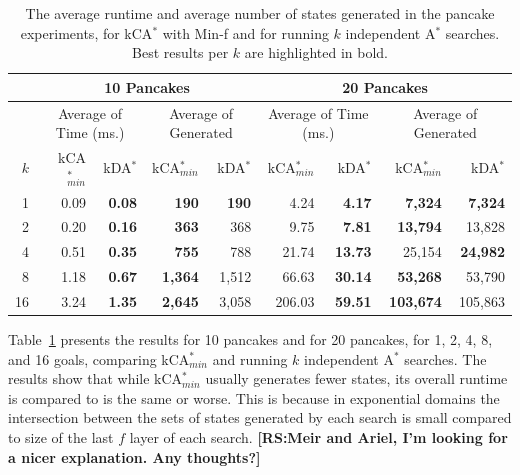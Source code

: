 \documentclass{aicom2e}
\newcommand{\astar}{A$^*$}
\newcommand{\kastar}{kCA$^*$}
\newcommand{\kastarmin}{kCA$^*_{min}$}
\newcommand{\kxastar}{kDA$^*$}
\newcommand{\minf}{Min-f}
\newcommand{\roni}[1]{\textbf{[RS:#1]}}
\begin{document}
\begin{table}[]
    \centering
    \begin{tabular}{|r|r|r|r|r|r|r|r|r|}
    \hline
        & \multicolumn{4}{c|}{{\bf 10 Pancakes}} & \multicolumn{4}{c|}{{\bf 20 Pancakes}}    \\
        \hline
        & \multicolumn{2}{c|}{Average of Time (ms.)}   & \multicolumn{2}{c|}{Average of Generated}    & \multicolumn{2}{c|}{Average of Time (ms.)}   & \multicolumn{2}{c|}{Average of Generated}    \\
        \hline
        $k$ & \kastarmin{} & \kxastar{} & \kastarmin{} & \kxastar{} & \kastarmin{} & \kxastar{} & \kastarmin{} & \kxastar{}  \\ \hline
1           & 0.09                  & \textbf{0.08}       & \textbf{190}          & \textbf{190}        & 4.24                  & \textbf{4.17}       & \textbf{7,324}        & \textbf{7,324}      \\
2           & 0.20                  & \textbf{0.16}       & \textbf{363}          & 368                 & 9.75                  & \textbf{7.81}       & \textbf{13,794}       & 13,828              \\
4           & 0.51                  & \textbf{0.35}       & \textbf{755}          & 788                 & 21.74                 & \textbf{13.73}      & 25,154                & \textbf{24,982}     \\
8           & 1.18                  & \textbf{0.67}       & \textbf{1,364}        & 1,512               & 66.63                 & \textbf{30.14}      & \textbf{53,268}       & 53,790              \\
16          & 3.24                  & \textbf{1.35}       & \textbf{2,645}
& 3,058               & 206.03                & \textbf{59.51}      &
\textbf{103,674}       & 105,863\\
\hline
    \end{tabular}
    \caption{The average runtime and average number of states generated in the pancake experiments, for \kastar{} with \minf{} and for running $k$ independent \astar{} searches. Best results per $k$ are highlighted in bold.}
    \label{tab:pancake-minf-k-searches}
\end{table}


Table~\ref{tab:pancake-minf-k-searches} presents the results for 10 pancakes
and for 20 pancakes, for 1, 2, 4, 8, and 16 goals, comparing \kastarmin{} and
running $k$ independent \astar{} searches. The results show that while
\kastarmin{} usually generates fewer states, its overall runtime is compared to
\kxatar{} is the same or worse. This is because in exponential domains the
intersection between the sets of states generated by each search is small
compared to size of the last $f$ layer of each search. \roni{Meir and Ariel,
I'm looking for a nicer explanation. Any thoughts?}
\end{document}
